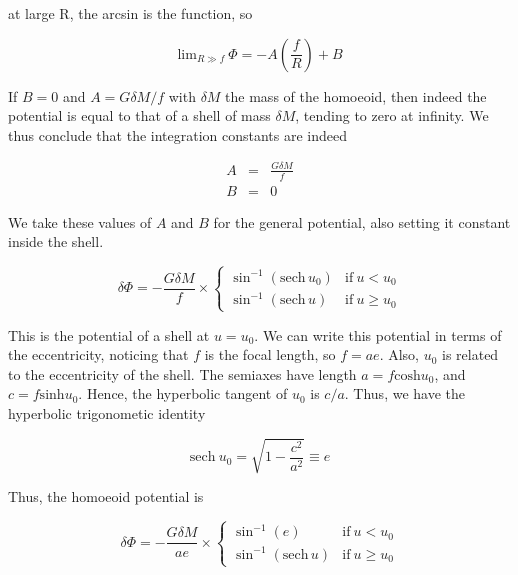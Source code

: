 at large R, the arcsin is the function, so  

\begin{equation}
\mathrm{lim}_{R \gg f }\ \varPhi = -A\left(\frac{f}{R}\right) + B 
\end{equation}

If $B =0$ and $A = G\delta M/f$ with $\delta M$ the mass of the homoeoid, then indeed the potential is equal to that of a shell of mass $\delta M$, tending to zero at infinity. We thus conclude that the integration constants are indeed 

\begin{eqnarray}
A&=&\frac{G\delta M}{f}\\
B&=&0
\end{eqnarray}

We take these values of $A$ and $B$ for the general potential, also setting it constant inside the shell. 

\begin{equation}
\delta\varPhi = -\frac{G\delta M}{f} \times \left\{ \begin{array}{cc} 
\sin^{-1}(\mathrm{sech}\,u_0) & \mathrm{if} \ u < u_0 \\
\sin^{-1}(\mathrm{sech}\,u) & \mathrm{if} \ u \geq u_0
\end{array} \right.
\end{equation}

This is the potential of a shell at $u=u_0$. We can write this potential in terms of the eccentricity, noticing that $f$ is the focal length, so $f=ae$. Also, $u_0$ is related to the eccentricity of the shell. The semiaxes have length $a = f \mathrm{cosh} u_0$, and $c=f\mathrm{sinh} u_0$. Hence, the hyperbolic tangent of $u_0$ is $c/a$. Thus, we have the hyperbolic trigonometic identity  

\begin{equation}
 \mathrm{sech} \ u_0 = \sqrt{1-\frac{c^2}{a^2}}  \equiv e 
\end{equation}


Thus, the homoeoid potential is 

\begin{equation}
\boxed{
\delta\varPhi = -\frac{G\delta M}{ae} \times \left\{ \begin{array}{ll} 
\sin^{-1}(e) & \mathrm{if} \ u < u_0 \\
\sin^{-1}(\mathrm{sech}\,u) & \mathrm{if} \ u \geq u_0
\end{array} \right.}
\end{equation}


